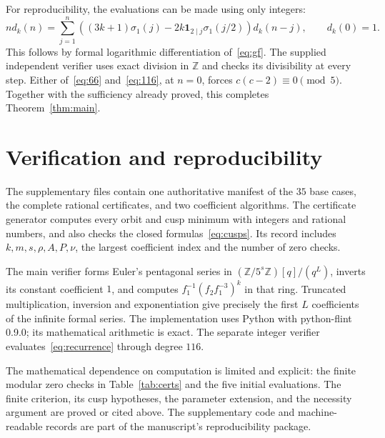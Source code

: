\documentclass[11pt]{article}
\newcommand{\Z}{\mathbb Z}
\begin{document}
For reproducibility, the evaluations can be made using only integers:
\begin{equation}\label{eq:recurrence}
 n d_k(n)=\sum_{j=1}^n\left((3k+1)\sigma_1(j)
 -2k\mathbf1_{2\mid j}\sigma_1(j/2)\right)d_k(n-j),
 \qquad d_k(0)=1.
\end{equation}
This follows by formal logarithmic differentiation of~\eqref{eq:gf}. The supplied independent verifier uses exact division in $\Z$ and checks its divisibility at every step. Either of~\eqref{eq:66} and~\eqref{eq:116}, at $n=0$, forces $c(c-2)\equiv0\pmod5$. Together with the sufficiency already proved, this completes Theorem~\ref{thm:main}.

\section{Verification and reproducibility}
The supplementary files contain one authoritative manifest of the $35$ base cases, the complete rational certificates, and two coefficient algorithms. The certificate generator computes every orbit and cusp minimum with integers and rational numbers, and also checks the closed formulas~\eqref{eq:cusps}. Its record includes $k,m,s,\rho,A,P,\nu$, the largest coefficient index and the number of zero checks.

The main verifier forms Euler's pentagonal series in $(\Z/5^s\Z)[q]/(q^L)$, inverts its constant coefficient $1$, and computes $f_1^{-1}(f_2f_1^{-3})^k$ in that ring. Truncated multiplication, inversion and exponentiation give precisely the first $L$ coefficients of the infinite formal series. The implementation uses Python with python-flint 0.9.0; its mathematical arithmetic is exact. The separate integer verifier evaluates~\eqref{eq:recurrence} through degree $116$.

The mathematical dependence on computation is limited and explicit: the finite modular zero checks in Table~\ref{tab:certs} and the five initial evaluations. The finite criterion, its cusp hypotheses, the parameter extension, and the necessity argument are proved or cited above. The supplementary code and machine-readable records are part of the manuscript's reproducibility package.
\end{document}

